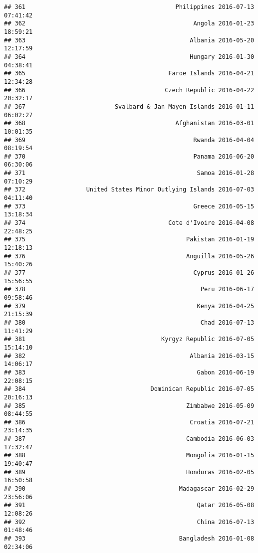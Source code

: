 \documentclass[
]{article}
\begin{document}
\begin{verbatim}
## 361                                          Philippines 2016-07-13 07:41:42
## 362                                               Angola 2016-01-23 18:59:21
## 363                                              Albania 2016-05-20 12:17:59
## 364                                              Hungary 2016-01-30 04:38:41
## 365                                        Faroe Islands 2016-04-21 12:34:28
## 366                                       Czech Republic 2016-04-22 20:32:17
## 367                         Svalbard & Jan Mayen Islands 2016-01-11 06:02:27
## 368                                          Afghanistan 2016-03-01 10:01:35
## 369                                               Rwanda 2016-04-04 08:19:54
## 370                                               Panama 2016-06-20 06:30:06
## 371                                                Samoa 2016-01-28 07:10:29
## 372                 United States Minor Outlying Islands 2016-07-03 04:11:40
## 373                                               Greece 2016-05-15 13:18:34
## 374                                        Cote d'Ivoire 2016-04-08 22:48:25
## 375                                             Pakistan 2016-01-19 12:18:13
## 376                                             Anguilla 2016-05-26 15:40:26
## 377                                               Cyprus 2016-01-26 15:56:55
## 378                                                 Peru 2016-06-17 09:58:46
## 379                                                Kenya 2016-04-25 21:15:39
## 380                                                 Chad 2016-07-13 11:41:29
## 381                                      Kyrgyz Republic 2016-07-05 15:14:10
## 382                                              Albania 2016-03-15 14:06:17
## 383                                                Gabon 2016-06-19 22:08:15
## 384                                   Dominican Republic 2016-07-05 20:16:13
## 385                                             Zimbabwe 2016-05-09 08:44:55
## 386                                              Croatia 2016-07-21 23:14:35
## 387                                             Cambodia 2016-06-03 17:32:47
## 388                                             Mongolia 2016-01-15 19:40:47
## 389                                             Honduras 2016-02-05 16:50:58
## 390                                           Madagascar 2016-02-29 23:56:06
## 391                                                Qatar 2016-05-08 12:08:26
## 392                                                China 2016-07-13 01:48:46
## 393                                           Bangladesh 2016-01-08 02:34:06

\end{verbatim}
\end{document}
